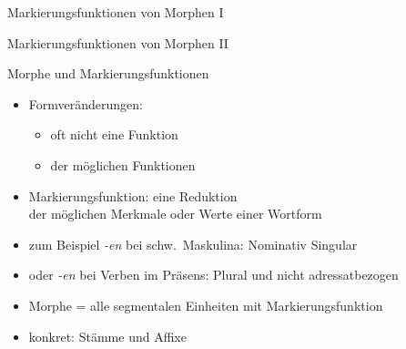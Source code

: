 \begin{frame}
  {Markierungsfunktionen von Morphen I}
  \pause
  \begin{exe}
    \ex
    \begin{xlist}
    \end{xlist}
    \pause
    \ex
    \begin{xlist}
    \end{xlist}
  \end{exe}
\end{frame}

\begin{frame}
  {Markierungsfunktionen von Morphen II}
  \pause
  \begin{exe}
    \ex
    \begin{xlist}
    \end{xlist}
  \end{exe}
\end{frame}

\begin{frame}
  {Morphe und Markierungsfunktionen}
  \pause
  \begin{itemize}[<+->]
    \item Formveränderungen:
      \begin{itemize}[<+->]
        \item oft nicht \alert{eine} Funktion
        \item {} der möglichen Funktionen
      \end{itemize}
   \Halbzeile 
    \item \alert{Markierungsfunktion}: eine \alert{Reduktion}\\
      der möglichen Merkmale oder Werte einer Wortform
    \item zum Beispiel \textit{-en} bei schw.\ Maskulina:  Nominativ Singular
    \item oder \textit{-en} bei Verben im Präsens: Plural und nicht adressatbezogen
      \Halbzeile
    \item \alert{Morphe = alle segmentalen Einheiten mit Markierungsfunktion}
    \item konkret: \alert{Stämme} und \alert{Affixe}
  \end{itemize}
\end{frame}

